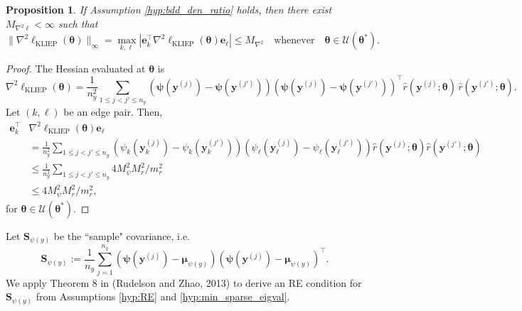 \documentclass[11pt]{article}
\numberwithin{equation}{section}
\numberwithin{theorem}{section}
\def\Sbb{\mathbf{S}}
\def\fate{\boldsymbol{e}}
\def\faty{\boldsymbol{y}}
\def\fatmu{\boldsymbol{\mu}}
\def\fattheta{\boldsymbol{\theta}}
\def\fatpsi{\boldsymbol{\psi}}
\newtheorem{prop}[lem]{Proposition}
\theoremstyle{definition}
\theoremstyle{remark}
\begin{document}
\begin{prop}
If Assumption \ref{hyp:bdd_den_ratio} holds, then there exist $M_{\nabla^2 \ell} < \infty$ such that
\begin{equation}
\|\nabla^2 \ell_\text{KLIEP}(\fattheta)\|_\infty
= \max_{k,\ell} |\fate_k^\top \nabla^2 \ell_\text{KLIEP}(\fattheta) \fate_\ell|
\leq M_{\nabla^2} \quad \text{whenever} \quad \fattheta \in \mathcal{U}(\fattheta^*).
\end{equation}
\end{prop}

\begin{proof}
The Hessian evaluated at $\fattheta$ is
\begin{equation}
\nabla^2 \ell_\text{KLIEP}(\fattheta)
= \frac{1}{n_y^2}\sum_{1\leq j<j'\leq n_y} \left( \fatpsi(\faty^{(j)}) - \fatpsi(\faty^{(j')}) \right) \left( \fatpsi(\faty^{(j)}) - \fatpsi(\faty^{(j')}) \right)^\top \hat r(\faty^{(j)};\fattheta) \, \hat r(\faty^{(j')};\fattheta).
\end{equation}
Let $(k,\ell)$ be an edge pair.
Then,
\begin{equation}
\begin{aligned}
\fate_k^\top & \nabla^2 \ell_\text{KLIEP}(\fattheta) \fate_\ell \\
&= \frac{1}{n_y^2} \sum_{1 \leq j < j' \leq n_y} \left( \psi_k(\faty_k^{(j)}) - \psi_k(\faty_k^{(j')}) \right) \left( \psi_\ell(\faty_\ell^{(j)}) - \psi_\ell(\faty_\ell^{(j')}) \right) \hat r(\faty^{(j)};\fattheta) \hat r(\faty^{(j')};\fattheta) \\
&\leq \frac{1}{n_y^2} \sum_{1 \leq j < j' \leq n_y} 4 M_\psi^2 M_r^2 / m_r^2 \\
&\leq 4 M_\psi^2 M_r^2 / m_r^2,
\end{aligned}
\end{equation}
for $\fattheta \in \mathcal{U}(\fattheta^*)$.
\end{proof}

Let $\Sbb_{\psi(y)}$ be the ``sample" covariance, i.e.
\begin{equation}
\Sbb_{\psi(y)}
:= \frac{1}{n_y} \sum_{j=1}^{n_y} \left( \fatpsi(\faty^{(j)}) - \fatmu_{\psi(y)} \right) \left( \fatpsi(\faty^{(j)}) - \fatmu_{\psi(y)} \right)^\top.
\end{equation}
We apply Theorem 8 in (Rudelson and Zhao, 2013) to derive an RE condition for $\Sbb_{\psi(y)}$ from Assumptions \ref{hyp:RE} and \ref{hyp:min_sparse_eigval}.
\end{document}
